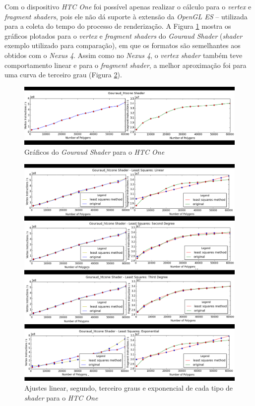 	Com o dispositivo \textit{HTC One} foi possível apenas realizar o cálculo para o \textit{vertex} e \textit{fragment shaders}, pois ele não dá suporte à extensão da \textit{OpenGL ES} -- utilizada para a coleta do tempo do processo de renderização. A Figura \ref{htc1} mostra os gráficos plotados para o \textit{vertex} e \textit{fragment shaders} do \textit{Gouraud Shader} (\textit{shader} exemplo utilizado para comparação), em que os formatos são semelhantes aos obtidos com o \textit{Nexus 4}. Assim como no \textit{Nexus 4}, o \textit{vertex shader} também teve comportamento linear e para o \textit{fragment shader}, a melhor aproximação foi para uma curva de terceiro grau (Figura \ref{htc1_ajuste}). 

	\begin{figure}[ht]
	\centering
		\includegraphics[keepaspectratio=true,scale=0.55]{figuras/htc_render.png}
	\caption{Gráficos do \textit{Gouraud Shader} para o \textit{HTC One}}
	\label{htc1}
	\end{figure}

	\begin{figure}[ht]
	\centering
		\includegraphics[keepaspectratio=true,scale=0.4]{figuras/htc_minquad_render.png}
	\caption{Ajustes linear, segundo, terceiro graus e exponencial de cada tipo de \textit{shader} para o \textit{HTC One}}
	\label{htc1_ajuste}
	\end{figure}	
	

